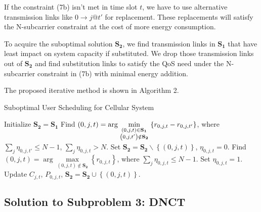 \documentclass{ieeeaccess}
\begin{document}
If the constraint (7b) isn't met in time slot ${t}$, we have to use alternative transmission links like $0 \to j@t'$ for replacement. These replacements will satisfy the N-subcarrier constraint at the cost of more energy consumption. 

To acquire the suboptimal solution ${{\mathbf{S}}_{\mathbf{2}}}$, we find transmission links in ${{\mathbf{S}}_{\mathbf{1}}}$ that have least impact on system capacity if substituted. We drop those transmission links out of ${{\mathbf{S}}_{\mathbf{2}}}$ and find substitution links to satisfy the QoS need under the N-subcarrier constraint in (7b) with minimal energy addition. 

The proposed iterative method is shown in Algorithm 2.

\begin{algorithm}[h]
\caption{Suboptimal User Scheduling for Cellular System}
\label{alg:1}
\begin{algorithmic}[1]
\STATE Initialize ${{\mathbf{S}}_{\mathbf{2}}}={{\mathbf{S}}_{\mathbf{1}}}$
  \STATE Find $\left( {0,j,t} \right) = \arg \mathop {\min }\limits_{\scriptstyle \left( {0,j,t} \right) \in {{\mathbf{S}}_{\mathbf{1}}} \atop
  \scriptstyle \left( {0,j,t'} \right) \notin {{\mathbf{S}}_{\mathbf{2}}}}  \left\{ {{r_{0,j,t}} - {r_{0,j,t'}}} \right\}$, where $\sum\limits_{j} {{\eta _{0,j,t'}}}  \le N - 1$, $\sum\limits_j {{\eta _{0,j,t}} > N} $.
  \STATE Set ${{\mathbf{S}}_{\mathbf{2}}}={{\mathbf{S}}_{\mathbf{2}}}\backslash \left\{ {\left( {0,j,t} \right)} \right\}$, ${\eta _{0,j,t}} = 0$.
    \STATE Find ${\left( {0,j,t} \right) = \arg \mathop {\max }\limits_{\left( {0,j,t} \right) \notin {{\mathbf{S}}_{\mathbf{2}}}} \left\{ {{r_{0,j,t}}} \right\}}$, where ${\sum\limits_j {{\eta _{0,j,t}}}  \le N - 1}$.
    \STATE Set ${\eta _{0,j,t}} = 1$.
    \STATE Update ${C_{j,t}}$, ${P_{0,j,t}}$, ${{\mathbf{S}}_{\mathbf{2}}}={{\mathbf{S}}_{\mathbf{2}}} \cup \left\{ {\left( {0,j,t} \right)} \right\}$.
  \ENDWHILE
\ENDWHILE
\end{algorithmic}
\end{algorithm}

\subsection{Solution to \textbf{Subproblem 3: DNCT}}
\end{document}
